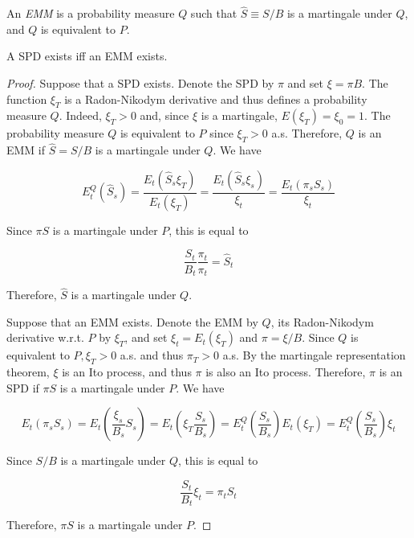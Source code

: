 \documentclass[\topdir/lecture\_notes.tex]{subfiles}
\begin{document}
\begin{defn}\label{def:emm}
An \emph{EMM} is a probability measure $Q$ such that $\hat{S} \equiv S / B$ is a martingale under $Q$, and $Q$ is equivalent to $P$.
\end{defn}

\begin{proposition}\label{prop:spd_emm_equivalence}
A SPD exists iff an EMM exists.
\end{proposition}

\begin{proof}
Suppose that a SPD exists. Denote the SPD by $\pi$ and set $\xi=\pi B$. The function $\xi_{T}$ is a Radon-Nikodym derivative and thus defines a probability measure $Q$. Indeed, $\xi_{T}>0$ and, since $\xi$ is a martingale, $E\left(\xi_{T}\right)=\xi_{0}=1$. The probability measure $Q$ is equivalent to $P$ since $\xi_{T}>0$ a.s. Therefore, $Q$ is an EMM if $\hat{S}=S / B$ is a martingale under $Q$. We have

\begin{equation*}
E_{t}^{Q}\left(\hat{S}_{s}\right)=\frac{E_{t}\left(\hat{S}_{s} \xi_{T}\right)}{E_{t}\left(\xi_{T}\right)}=\frac{E_{t}\left(\hat{S}_{s} \xi_{s}\right)}{\xi_{t}}=\frac{E_{t}\left(\pi_{s} S_{s}\right)}{\xi_{t}}
\end{equation*}

Since $\pi S$ is a martingale under $P$, this is equal to

\begin{equation*}
\frac{S_{t}}{B_{t}} \frac{\pi_{t}}{\pi_{t}}=\hat{S}_{t}
\end{equation*}

Therefore, $\hat{S}$ is a martingale under $Q$.

Suppose that an EMM exists. Denote the EMM by $Q$, its Radon-Nikodym derivative w.r.t. $P$ by $\xi_{T}$, and set $\xi_{t}=E_{t}\left(\xi_{T}\right)$ and $\pi=\xi / B$. Since $Q$ is equivalent to $P, \xi_{T}>0$ a.s. and thus $\pi_{T}>0$ a.s. By the martingale representation theorem, $\xi$ is an Ito process, and thus $\pi$ is also an Ito process. Therefore, $\pi$ is an SPD if $\pi S$ is a martingale under $P$. We have

\begin{equation*}
E_{t}\left(\pi_{s} S_{s}\right)=E_{t}\left(\frac{\xi_{s}}{B_{s}} S_{s}\right)=E_{t}\left(\xi_{T} \frac{S_{s}}{B_{s}}\right)=E_{t}^{Q}\left(\frac{S_{s}}{B_{s}}\right) E_{t}\left(\xi_{T}\right)=E_{t}^{Q}\left(\frac{S_{s}}{B_{s}}\right) \xi_{t}
\end{equation*}

Since $S / B$ is a martingale under $Q$, this is equal to

\begin{equation*}
\frac{S_{t}}{B_{t}} \xi_{t}=\pi_{t} S_{t}
\end{equation*}

Therefore, $\pi S$ is a martingale under $P$.
\end{proof}
\end{document}
